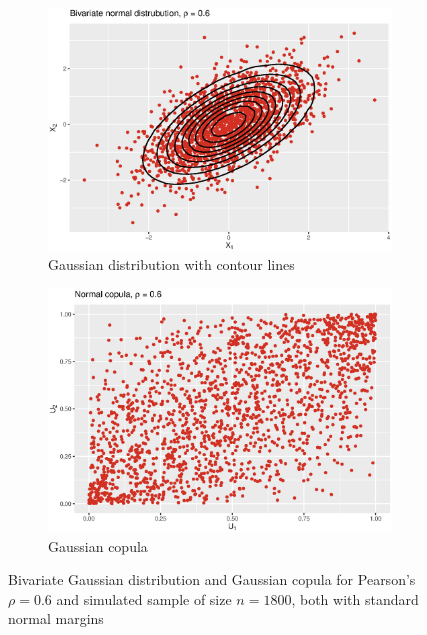  \begin{figure}[H]
\centering
\begin{subfigure}{.45\textwidth}
  \centering
  \includegraphics[width=\linewidth]{figures/bivariate_normal.eps}
  \caption{Gaussian distribution with contour lines}
  \label{fig:mvd_normal_copula}
\end{subfigure}
\begin{subfigure}{.45\textwidth}
  \centering
  \includegraphics[width=\linewidth]{figures/normal_copula.eps}
  \caption{Gaussian copula}
  \label{fig:normal_copula}
\end{subfigure}
\caption{Bivariate Gaussian distribution and Gaussian copula for Pearson's $\rho = 0.6$ and simulated sample of size $n = 1800$, both with standard normal margins}
\label{fig:normal_plots}
\end{figure}






